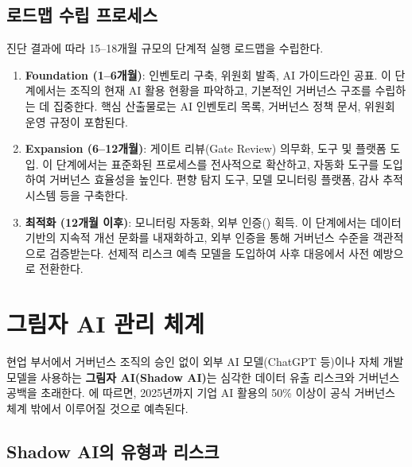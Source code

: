 \subsection{로드맵 수립 프로세스}
\label{sec:8.6.4}

진단 결과에 따라 15--18개월 규모의 단계적 실행 로드맵을 수립한다.

\begin{enumerate}
    \item \textbf{Foundation (1--6개월)}: 인벤토리 구축, 위원회 발족, AI 가이드라인 공표. 이 단계에서는 조직의 현재 AI 활용 현황을 파악하고, 기본적인 거버넌스 구조를 수립하는 데 집중한다. 핵심 산출물로는 AI 인벤토리 목록, 거버넌스 정책 문서, 위원회 운영 규정이 포함된다.

    \item \textbf{Expansion (6--12개월)}: 게이트 리뷰(Gate Review) 의무화, 도구 및 플랫폼 도입. 이 단계에서는 표준화된 프로세스를 전사적으로 확산하고, 자동화 도구를 도입하여 거버넌스 효율성을 높인다. 편향 탐지 도구, 모델 모니터링 플랫폼, 감사 추적 시스템 등을 구축한다.

    \item \textbf{최적화 (12개월 이후)}: 모니터링 자동화, 외부 인증(\cite{iso42001}) 획득. 이 단계에서는 데이터 기반의 지속적 개선 문화를 내재화하고, 외부 인증을 통해 거버넌스 수준을 객관적으로 검증받는다. 선제적 리스크 예측 모델을 도입하여 사후 대응에서 사전 예방으로 전환한다.
\end{enumerate}

\section{그림자 AI 관리 체계}
\label{sec:8.7}

현업 부서에서 거버넌스 조직의 승인 없이 외부 AI 모델(ChatGPT 등)이나 자체 개발 모델을 사용하는 \textbf{그림자 AI(Shadow AI)}는 심각한 데이터 유출 리스크와 거버넌스 공백을 초래한다. \cite{gartner2023shadow}에 따르면, 2025년까지 기업 AI 활용의 50\% 이상이 공식 거버넌스 체계 밖에서 이루어질 것으로 예측된다.

\subsection{Shadow AI의 유형과 리스크}
\label{sec:8.7.1}

